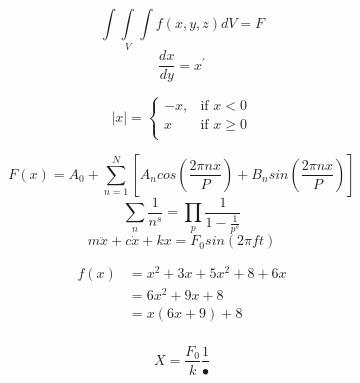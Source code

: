 \documentclass[a4paper]{article}
\begin{document}
\begin{center}
$$ \int\int\limits_{V}\int f(x,y,z)dV=F $$
$$ \frac{dx}{dy}=x^\prime $$
\end{center}


\begin{equation}
  |x| =
    \begin{cases}
      -x, & \text{if $x < 0$}\\
      x & \text{if $x \geq 0$}\\
    \end{cases}       
\end{equation}

\begin{center}
$$ F(x)=A_{0}+\sum_{n=1}^{N} \left[ A_{n} cos\left(\frac{2\pi nx}{P}\right)+ B_{n} sin\left(\frac{2\pi nx}{P}\right) \right]$$
$$ \sum_{n}\frac{1}{n^s}=\prod_{p} \frac{1}{1-\frac{1}{p^s}} $$
$$ m\ddot{x}+c\dot{x}+kx=F_{0}sin(2\pi ft) $$
\end{center}

\begin{align}
f(x) &= x^2+3x+5x^2+8+6x \\
&= 6x^2+9x+8 \\
&= x(6x+9)+8 \\
\end{align}

\begin{center}
$$ X=\frac{F_{0}}{k}\frac{1}{•}$$
\end{center}
\end{document}
